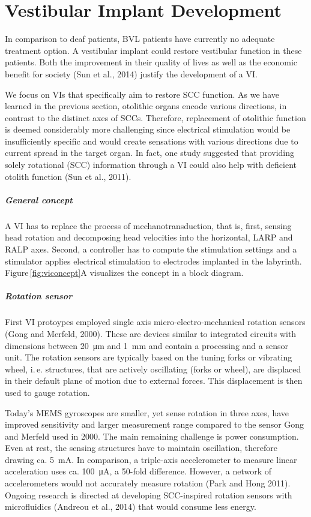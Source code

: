 \section{Vestibular Implant Development}\label{sec:background:VI}
In comparison to deaf patients, BVL patients have currently no adequate treatment option. A vestibular implant could restore vestibular function in these patients. Both the improvement in their quality of lives as well as the economic benefit for society (Sun et al., 2014) justify the development of a VI.

We focus on VIs that specifically aim to restore SCC function. As we have learned in the previous section, otolithic organs encode various directions, in contrast to the distinct axes of SCCs. Therefore, replacement of otolithic function is deemed considerably more challenging since electrical stimulation would be insufficiently specific and would create sensations with various directions due to current spread in the target organ. In fact, one study suggested that providing solely rotational (SCC) information through a VI could also help with deficient otolith function (Sun et al., 2011).

\subparagraph{General concept}
A VI has to replace the process of mechanotransduction, that is, first, sensing head rotation and decomposing head velocities into the horizontal, LARP and RALP axes. Second, a controller has to compute the stimulation settings and a stimulator applies electrical stimulation to electrodes implanted in the labyrinth. Figure\,\ref{fig:viconcept}A visualizes the concept in a block diagram.
 
\subparagraph{Rotation sensor}
First VI protoypes employed single axis micro-electro-mech\-anical rotation sensors (Gong and Merfeld, 2000). These are devices similar to integrated circuits with dimensions between \SI{20}{\micro\metre} and \SI{1}{\milli\metre} and contain a processing and a sensor unit. The rotation sensors are typically based on the tuning forks or vibrating wheel, i.\,e. structures, that are actively oscillating  (forks or wheel), are displaced in their default plane of motion due to external forces. This displacement is then used to gauge rotation.

Today's MEMS gyroscopes are smaller, yet sense rotation in three axes, have improved sensitivity and larger measurement range compared to the sensor Gong and Merfeld used in 2000. The main remaining challenge is power consumption. Even at rest, the sensing structures have to maintain oscillation, therefore drawing ca. \SI{5}{\milli\ampere}. In comparison, a triple-axis accelerometer to measure linear acceleration uses ca. \SI{100}{\micro\ampere}, a 50-fold difference. However, a network of accelerometers would not accurately measure rotation (Park and Hong 2011). Ongoing research is directed at developing SCC-inspired rotation sensors with microfluidics (Andreou et al., 2014) that would consume less energy.
 
